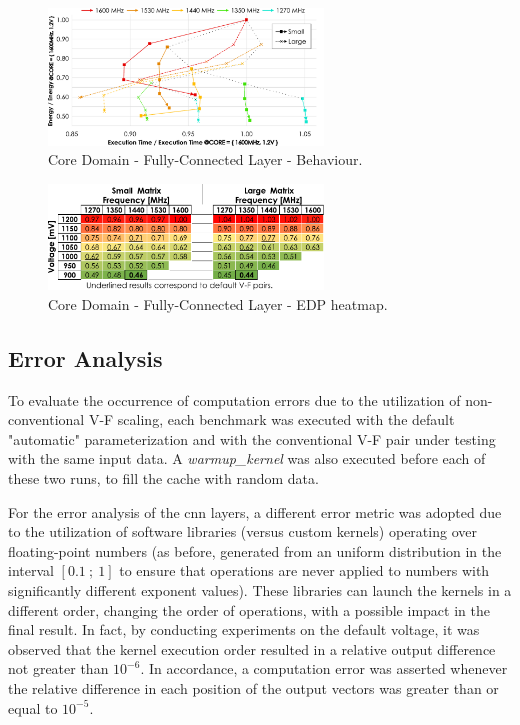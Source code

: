 \begin{figure}[htbp]
    \centering
        \includegraphics[width=0.65\textwidth]{Figures/Application To Deep Learning/MatrixMul_behaviour.pdf}
        \caption{Core Domain - Fully-Connected Layer - Behaviour.}
    \label{fig:MatrixMult_behaviour}
\end{figure}





\begin{figure}[htbp]
    \centering
        \includegraphics[width=0.65\textwidth]{Figures/Application To Deep Learning/MatrixMul_EDP.pdf}
        \caption{Core Domain - Fully-Connected Layer - EDP heatmap.}
    \label{fig:MatrixMult_EDP}
\end{figure}

\subsection{Error Analysis}

To evaluate the occurrence of computation errors due to the utilization of non-conventional V-F scaling, each benchmark was executed with the default "automatic" parameterization and with the conventional V-F pair under testing with the same input data. A \textit{warmup\_kernel} was also executed before each of these two runs, to fill the cache with random data. 


For the error analysis of the \acrshort{cnn} layers, a different error metric was adopted due to the utilization of software libraries (versus custom kernels) operating over floating-point numbers (as before, generated from an uniform distribution in the interval $[0.1~;~1]$ to ensure that operations are never applied to numbers with significantly different exponent values). These libraries can launch the kernels in a different order, changing the order of operations, with a possible impact in the final result. In fact, by conducting experiments on the default voltage, it was observed that the kernel execution order resulted in a relative output difference not greater than $10^{-6}$. In accordance, a computation error was asserted whenever the relative difference in each position of the output vectors was greater than or equal to  $10^{-5}$.

